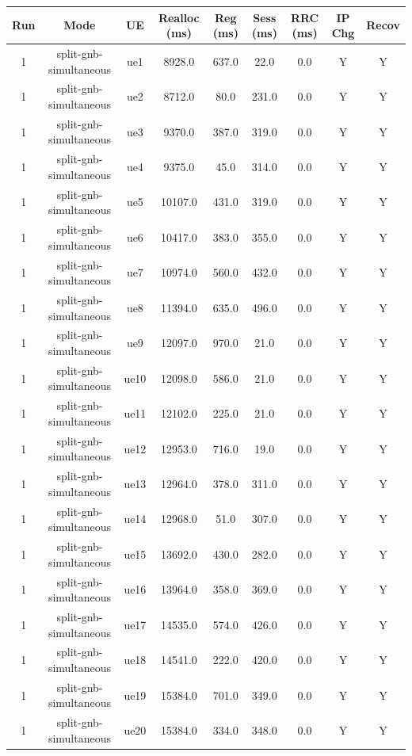\begin{table}[ht]
\centering
\begin{tabular}{|c|c|c|c|c|c|c|c|c|}
\hline
Run & Mode & UE & Realloc (ms) & Reg (ms) & Sess (ms) & RRC (ms) & IP Chg & Recov \\
\hline
1 & split-gnb-simultaneous & ue1 & 8928.0 & 637.0 & 22.0 & 0.0 & Y & Y \\
1 & split-gnb-simultaneous & ue2 & 8712.0 & 80.0 & 231.0 & 0.0 & Y & Y \\
1 & split-gnb-simultaneous & ue3 & 9370.0 & 387.0 & 319.0 & 0.0 & Y & Y \\
1 & split-gnb-simultaneous & ue4 & 9375.0 & 45.0 & 314.0 & 0.0 & Y & Y \\
1 & split-gnb-simultaneous & ue5 & 10107.0 & 431.0 & 319.0 & 0.0 & Y & Y \\
1 & split-gnb-simultaneous & ue6 & 10417.0 & 383.0 & 355.0 & 0.0 & Y & Y \\
1 & split-gnb-simultaneous & ue7 & 10974.0 & 560.0 & 432.0 & 0.0 & Y & Y \\
1 & split-gnb-simultaneous & ue8 & 11394.0 & 635.0 & 496.0 & 0.0 & Y & Y \\
1 & split-gnb-simultaneous & ue9 & 12097.0 & 970.0 & 21.0 & 0.0 & Y & Y \\
1 & split-gnb-simultaneous & ue10 & 12098.0 & 586.0 & 21.0 & 0.0 & Y & Y \\
1 & split-gnb-simultaneous & ue11 & 12102.0 & 225.0 & 21.0 & 0.0 & Y & Y \\
1 & split-gnb-simultaneous & ue12 & 12953.0 & 716.0 & 19.0 & 0.0 & Y & Y \\
1 & split-gnb-simultaneous & ue13 & 12964.0 & 378.0 & 311.0 & 0.0 & Y & Y \\
1 & split-gnb-simultaneous & ue14 & 12968.0 & 51.0 & 307.0 & 0.0 & Y & Y \\
1 & split-gnb-simultaneous & ue15 & 13692.0 & 430.0 & 282.0 & 0.0 & Y & Y \\
1 & split-gnb-simultaneous & ue16 & 13964.0 & 358.0 & 369.0 & 0.0 & Y & Y \\
1 & split-gnb-simultaneous & ue17 & 14535.0 & 574.0 & 426.0 & 0.0 & Y & Y \\
1 & split-gnb-simultaneous & ue18 & 14541.0 & 222.0 & 420.0 & 0.0 & Y & Y \\
1 & split-gnb-simultaneous & ue19 & 15384.0 & 701.0 & 349.0 & 0.0 & Y & Y \\
1 & split-gnb-simultaneous & ue20 & 15384.0 & 334.0 & 348.0 & 0.0 & Y & Y \\

\end{tabular}
\end{table}
